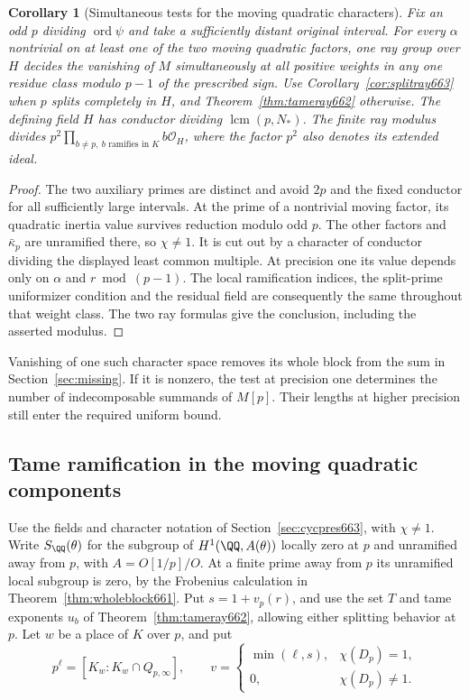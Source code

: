 \documentclass[a4paper,11pt]{article}
\newtheorem{corollary}[proposition]{Corollary}
\theoremstyle{definition}
\theoremstyle{remark}
\numberwithin{equation}{section}
\begin{document}
\begin{corollary}[Simultaneous tests for the moving quadratic characters]
\leavevmode\label{cor:allmoving663}
Fix an odd \(p\) dividing \(\operatorname{ord}\psi\) and take a
sufficiently distant original interval. For every \(\alpha\)
nontrivial on at least one of the two moving quadratic factors,
one ray group over \(H\) decides the vanishing of \(M\)
simultaneously at all positive weights in any one residue class
modulo \(p-1\) of the prescribed sign. Use
Corollary~\ref{cor:splitray663} when \(p\) splits completely
in \(H\), and Theorem~\ref{thm:tameray662} otherwise.
The defining field \(H\) has conductor dividing
\(\operatorname{lcm}(p,N_*)\). The finite ray modulus divides
\(p^2\prod_{b\ne p,\ b\text{ ramifies in }K} b\mathcal O_H\),
where the factor \(p^2\) also denotes its extended ideal.
\end{corollary}
\begin{proof}
The two auxiliary primes are distinct and avoid \(2p\) and the
fixed conductor for all sufficiently large intervals. At the
prime of a nontrivial moving factor, its quadratic inertia
value survives reduction modulo odd \(p\). The other factors
and \(\bar\kappa_p\) are unramified there, so \(\chi\ne1\).
It is cut out by a character of conductor dividing the displayed
least common multiple. At precision one its value depends only
on \(\alpha\) and \(r\bmod(p-1)\). The local ramification indices,
the split-prime uniformizer condition and the residual field
are consequently the same throughout that weight class. The two
ray formulas give the conclusion, including the asserted modulus.
\end{proof}

Vanishing of one such character space removes its whole block
from the sum in Section~\ref{sec:missing}. If it is nonzero, the
test at precision one determines the number of indecomposable
summands of \(M[p]\). Their lengths at higher precision still
enter the required uniform bound.


\subsection{Tame ramification in the moving quadratic components}
\label{sec:movinggenus665}

Use the fields and character notation of
Section~\ref{sec:cycpres663}, with \(\chi\ne1\). Write
\(S_{\QQ}(\theta)\) for the subgroup of \(H^1(\QQ,A(\theta))\)
locally zero at \(p\) and unramified away from \(p\), with
\(A=O[1/p]/O\). At a finite prime away from \(p\) its unramified
local subgroup is zero, by the Frobenius calculation in
Theorem~\ref{thm:wholeblock661}. Put \(s=1+v_p(r)\), and
use the set \(T\) and tame exponents \(u_b\) of
Theorem~\ref{thm:tameray662}, allowing either splitting behavior
at \(p\). Let \(w\) be a place of \(K\) over \(p\), and put
\[
       p^\ell=[K_w:K_w\cap Q_{p,\infty}],\qquad
       v=\begin{cases}
             \min(\ell,s),&\chi(D_p)=1,\\
             0,&\chi(D_p)\ne1.
          \end{cases}
\]
\end{document}
